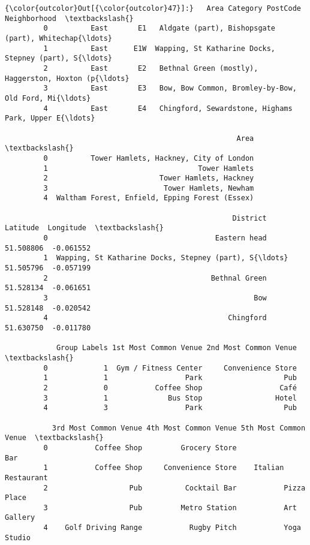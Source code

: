 \documentclass[11pt]{article}
\begin{document}
\begin{Verbatim}[commandchars=\\\{\}]
{\color{outcolor}Out[{\color{outcolor}47}]:}   Area Category PostCode                                       Neighborhood  \textbackslash{}
         0          East       E1   Aldgate (part), Bishopsgate (part), Whitechap{\ldots}   
         1          East      E1W  Wapping, St Katharine Docks, Stepney (part), S{\ldots}   
         2          East       E2   Bethnal Green (mostly), Haggerston, Hoxton (p{\ldots}   
         3          East       E3   Bow, Bow Common, Bromley-by-Bow, Old Ford, Mi{\ldots}   
         4          East       E4   Chingford, Sewardstone, Highams Park, Upper E{\ldots}   
         
                                                      Area  \textbackslash{}
         0          Tower Hamlets, Hackney, City of London   
         1                                   Tower Hamlets   
         2                          Tower Hamlets, Hackney   
         3                           Tower Hamlets, Newham   
         4  Waltham Forest, Enfield, Epping Forest (Essex)   
         
                                                     District   Latitude  Longitude  \textbackslash{}
         0                                       Eastern head  51.508806  -0.061552   
         1  Wapping, St Katharine Docks, Stepney (part), S{\ldots}  51.505796  -0.057199   
         2                                      Bethnal Green  51.528134  -0.061651   
         3                                                Bow  51.528148  -0.020542   
         4                                          Chingford  51.630750  -0.011780   
         
            Group Labels 1st Most Common Venue 2nd Most Common Venue  \textbackslash{}
         0             1  Gym / Fitness Center     Convenience Store   
         1             1                  Park                   Pub   
         2             0           Coffee Shop                  Café   
         3             1              Bus Stop                 Hotel   
         4             3                  Park                   Pub   
         
           3rd Most Common Venue 4th Most Common Venue 5th Most Common Venue  \textbackslash{}
         0           Coffee Shop         Grocery Store                   Bar   
         1           Coffee Shop     Convenience Store    Italian Restaurant   
         2                   Pub          Cocktail Bar           Pizza Place   
         3                   Pub         Metro Station           Art Gallery   
         4    Golf Driving Range           Rugby Pitch           Yoga Studio   
         

\end{Verbatim}
\end{document}
